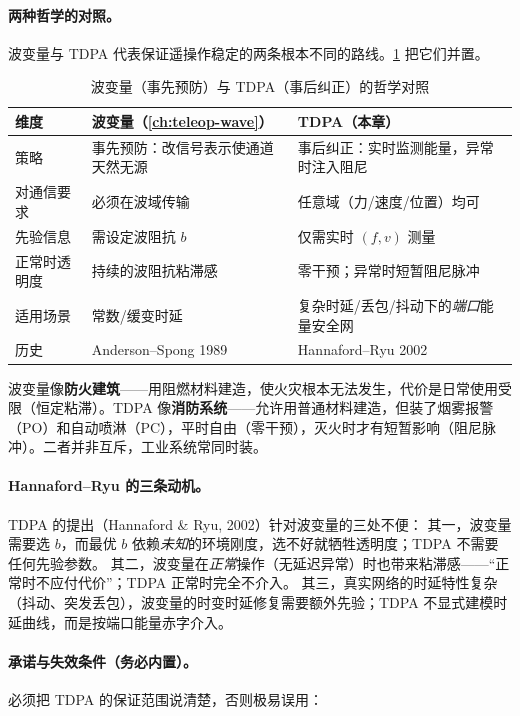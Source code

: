 \paragraph{两种哲学的对照。}
波变量与 TDPA 代表保证遥操作稳定的两条根本不同的路线。\cref{tab:tdpa-philosophy} 把它们并置。

\begin{table}[H]\centering\small
\caption{波变量（事先预防）与 TDPA（事后纠正）的哲学对照}
\label{tab:tdpa-philosophy}
\begin{tabular}{p{} p{} p{}}
\toprule
维度 & 波变量（\cref{ch:teleop-wave}） & TDPA（本章） \\
\midrule
策略 & 事先预防：改信号表示使通道天然无源 & 事后纠正：实时监测能量，异常时注入阻尼 \\
对通信要求 & 必须在波域传输 & 任意域（力/速度/位置）均可 \\
先验信息 & 需设定波阻抗 $b$ & 仅需实时 $(f,v)$ 测量 \\
正常时透明度 & 持续的波阻抗粘滞感 & 零干预；异常时短暂阻尼脉冲 \\
适用场景 & 常数/缓变时延 & 复杂时延/丢包/抖动下的\emph{端口}能量安全网 \\
历史 & Anderson--Spong 1989 & Hannaford--Ryu 2002 \\
\bottomrule
\end{tabular}
\end{table}

\begin{insight}
波变量像\textbf{防火建筑}——用阻燃材料建造，使火灾根本无法发生，代价是日常使用受限（恒定粘滞）。TDPA 像\textbf{消防系统}——允许用普通材料建造，但装了烟雾报警（PO）和自动喷淋（PC），平时自由（零干预），灭火时才有短暂影响（阻尼脉冲）。二者并非互斥，工业系统常同时装。
\end{insight}

\paragraph{Hannaford--Ryu 的三条动机。}
TDPA 的提出（Hannaford \& Ryu, 2002）针对波变量的三处不便：
其一，波变量需要选 $b$，而最优 $b$ 依赖\emph{未知}的环境刚度，选不好就牺牲透明度；TDPA 不需要任何先验参数。
其二，波变量在\emph{正常}操作（无延迟异常）时也带来粘滞感——“正常时不应付代价”；TDPA 正常时完全不介入。
其三，真实网络的时延特性复杂（抖动、突发丢包），波变量的时变时延修复需要额外先验；TDPA 不显式建模时延曲线，而是按端口能量赤字介入。

\paragraph{承诺与失效条件（务必内置）。}
必须把 TDPA 的保证范围说清楚，否则极易误用：

